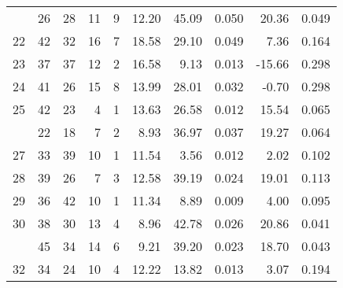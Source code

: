 \begin{tabular}[t]{rrrrrrrrrr}
\addlinespace
21 & 26 & 28 & 11 & 9 & 12.20 & 45.09 & 0.050 & 20.36 & 0.049\\
22 & 42 & 32 & 16 & 7 & 18.58 & 29.10 & 0.049 & 7.36 & 0.164\\
23 & 37 & 37 & 12 & 2 & 16.58 & 9.13 & 0.013 & -15.66 & 0.298\\
24 & 41 & 26 & 15 & 8 & 13.99 & 28.01 & 0.032 & -0.70 & 0.298\\
25 & 42 & 23 & 4 & 1 & 13.63 & 26.58 & 0.012 & 15.54 & 0.065\\
\addlinespace
26 & 22 & 18 & 7 & 2 & 8.93 & 36.97 & 0.037 & 19.27 & 0.064\\
27 & 33 & 39 & 10 & 1 & 11.54 & 3.56 & 0.012 & 2.02 & 0.102\\
28 & 39 & 26 & 7 & 3 & 12.58 & 39.19 & 0.024 & 19.01 & 0.113\\
29 & 36 & 42 & 10 & 1 & 11.34 & 8.89 & 0.009 & 4.00 & 0.095\\
30 & 38 & 30 & 13 & 4 & 8.96 & 42.78 & 0.026 & 20.86 & 0.041\\
\addlinespace
31 & 45 & 34 & 14 & 6 & 9.21 & 39.20 & 0.023 & 18.70 & 0.043\\
32 & 34 & 24 & 10 & 4 & 12.22 & 13.82 & 0.013 & 3.07 & 0.194\\
\bottomrule
\end{tabular}
